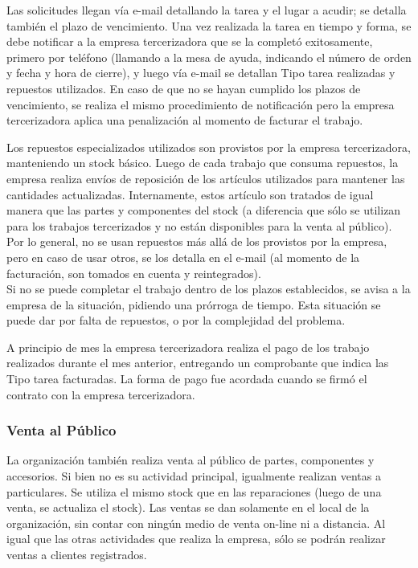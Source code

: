 \documentclass[12pt]{extarticle}
\begin{document}
\begin{spacing}{1.2}
    Las solicitudes llegan vía e-mail detallando la tarea y el lugar a acudir; se detalla también el plazo de vencimiento.
    Una vez realizada la tarea en tiempo y forma, se debe notificar a la empresa tercerizadora que se la completó exitosamente, primero por teléfono (llamando a la mesa de ayuda, indicando el número de orden y fecha y hora de cierre), y luego vía e-mail se detallan Tipo tarea realizadas y repuestos utilizados.
    En caso de que no se hayan cumplido los plazos de vencimiento, se realiza el mismo procedimiento de notificación pero la empresa tercerizadora aplica una penalización al momento de facturar el trabajo.

    Los repuestos especializados utilizados son provistos por la empresa tercerizadora, manteniendo un stock básico. Luego de cada trabajo que consuma repuestos, la empresa realiza envíos de reposición de los artículos utilizados para mantener las cantidades actualizadas. 
    Internamente, estos artículo son tratados de igual manera que las partes y componentes del stock (a diferencia que sólo se utilizan para los trabajos tercerizados y no están disponibles para la venta al público).
    Por lo general, no se usan repuestos más allá de los provistos por la empresa, pero en caso de usar otros, se los detalla en el e-mail (al momento de la facturación, son tomados en cuenta y reintegrados).\\

    Si no se puede completar el trabajo dentro de los plazos establecidos, se avisa a la empresa de la situación, pidiendo una prórroga de tiempo. Esta situación se puede dar por falta de repuestos, o por la complejidad del problema.

    A principio de mes la empresa tercerizadora realiza el pago de los trabajo realizados durante el mes anterior, entregando un comprobante que indica las Tipo tarea facturadas. La forma de pago fue acordada cuando se firmó el contrato con la empresa tercerizadora.


    \subsubsection{Venta al Público}
    La organización también realiza venta al público de partes, componentes y accesorios. Si bien no es su actividad principal, igualmente realizan ventas a particulares. Se utiliza el mismo stock que en las reparaciones (luego de una venta, se actualiza el stock). 
    Las ventas se dan solamente en el local de la organización, sin contar con ningún medio de venta on-line ni a distancia. Al igual que las otras actividades que realiza la empresa, sólo se podrán realizar ventas a clientes registrados.


\end{spacing}
\end{document}
